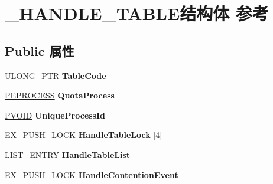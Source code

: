 \hypertarget{struct___h_a_n_d_l_e___t_a_b_l_e}{}\section{\+\_\+\+H\+A\+N\+D\+L\+E\+\_\+\+T\+A\+B\+L\+E结构体 参考}
\label{struct___h_a_n_d_l_e___t_a_b_l_e}
\subsection*{Public 属性}
\begin{DoxyCompactItemize}
\item 
\mbox{\label{struct___h_a_n_d_l_e___t_a_b_l_e_ac4681633a958e7859c4a918fa42455fc}} 
U\+L\+O\+N\+G\+\_\+\+P\+TR {\bfseries Table\+Code}
\item 
\mbox{\label{struct___h_a_n_d_l_e___t_a_b_l_e_a231c601f4edceb1a0e1d8e25157c6389}} 
\hyperlink{struct___e_p_r_o_c_e_s_s}{P\+E\+P\+R\+O\+C\+E\+SS} {\bfseries Quota\+Process}
\item 
\mbox{\label{struct___h_a_n_d_l_e___t_a_b_l_e_a4d2f590d28a5908fda218e82485f6fac}} 
\hyperlink{interfacevoid}{P\+V\+O\+ID} {\bfseries Unique\+Process\+Id}
\item 
\mbox{\label{struct___h_a_n_d_l_e___t_a_b_l_e_a124982edb01a5881dbad7e60f6875fe0}} 
\hyperlink{struct___e_x___p_u_s_h___l_o_c_k}{E\+X\+\_\+\+P\+U\+S\+H\+\_\+\+L\+O\+CK} {\bfseries Handle\+Table\+Lock} \mbox{[}4\mbox{]}
\item 
\mbox{\label{struct___h_a_n_d_l_e___t_a_b_l_e_aee56edc3a5d9859a5232e8b2874df6f9}} 
\hyperlink{struct___l_i_s_t___e_n_t_r_y}{L\+I\+S\+T\+\_\+\+E\+N\+T\+RY} {\bfseries Handle\+Table\+List}
\item 
\mbox{\label{struct___h_a_n_d_l_e___t_a_b_l_e_a784a4ff979766e0dc4cdebf0b096bfa8}} 
\hyperlink{struct___e_x___p_u_s_h___l_o_c_k}{E\+X\+\_\+\+P\+U\+S\+H\+\_\+\+L\+O\+CK} {\bfseries Handle\+Contention\+Event}
\item 
\mbox{\label{struct___h_a_n_d_l_e___t_a_b_l_e_a37c3bd0dbaada9559ee71aa10fcbd6a9}} 

\end{DoxyCompactItemize}
